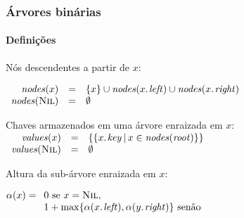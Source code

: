 \documentclass{beamer}
\begin{document}
\begin{frame}

  \frametitle{Árvores binárias}
  \framesubtitle{Definições}

  \begin{definition}
    Nós descendentes a partir de $x$:

    $\begin{array}{rcl}
      \id{nodes}(x) & = & \{ x \} \cup
    \id{nodes}(\attrib{x}{left}) \cup \id{nodes}(\attrib{x}{right}) \\
      \id{nodes}(\const{Nil}) & = & \emptyset
    \end{array}$
  \end{definition}

  \begin{definition}
    Chaves armazenados em uma árvore enraizada em $x$:
    $
    \begin{array}[t]{rcl}
      \id{values}(x) & = & \{ \{ \attrib{x}{key} \, | \, x \in \id{nodes}(\id{root}) \} \} \\
      \id{values}(\const{Nil}) & = & \emptyset
    \end{array}
    $
  \end{definition}

  \begin{definition}
    Altura da sub-árvore enraizada em $x$: 

    $\alpha(x) = 
    \begin{array}[t]{l}
      0 \mbox{ se } x = \const{Nil}, \\
      1 + \max \{ \alpha(\attrib{x}{left}), \alpha(\attrib{y}{right}) \} \mbox{ senão}
    \end{array}$
  \end{definition}

\end{frame}
\end{document}
